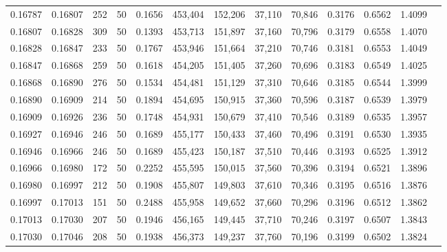 \begin{tabular}{rrrrrrrrrrrrr}
0.16787 & 0.16807 &   252 &  50 &                                     0.1656 & 453,404 & 152,206 &  37,110 &  70,846 & 0.3176 & 0.6562 & 1.4099 \\
0.16807 & 0.16828 &   309 &  50 &                                     0.1393 & 453,713 & 151,897 &  37,160 &  70,796 & 0.3179 & 0.6558 & 1.4070 \\
0.16828 & 0.16847 &   233 &  50 &                                     0.1767 & 453,946 & 151,664 &  37,210 &  70,746 & 0.3181 & 0.6553 & 1.4049 \\
0.16847 & 0.16868 &   259 &  50 &                                     0.1618 & 454,205 & 151,405 &  37,260 &  70,696 & 0.3183 & 0.6549 & 1.4025 \\
0.16868 & 0.16890 &   276 &  50 &                                     0.1534 & 454,481 & 151,129 &  37,310 &  70,646 & 0.3185 & 0.6544 & 1.3999 \\
0.16890 & 0.16909 &   214 &  50 &                                     0.1894 & 454,695 & 150,915 &  37,360 &  70,596 & 0.3187 & 0.6539 & 1.3979 \\
0.16909 & 0.16926 &   236 &  50 &                                     0.1748 & 454,931 & 150,679 &  37,410 &  70,546 & 0.3189 & 0.6535 & 1.3957 \\
0.16927 & 0.16946 &   246 &  50 &                                     0.1689 & 455,177 & 150,433 &  37,460 &  70,496 & 0.3191 & 0.6530 & 1.3935 \\
0.16946 & 0.16966 &   246 &  50 &                                     0.1689 & 455,423 & 150,187 &  37,510 &  70,446 & 0.3193 & 0.6525 & 1.3912 \\
0.16966 & 0.16980 &   172 &  50 &                                     0.2252 & 455,595 & 150,015 &  37,560 &  70,396 & 0.3194 & 0.6521 & 1.3896 \\
0.16980 & 0.16997 &   212 &  50 &                                     0.1908 & 455,807 & 149,803 &  37,610 &  70,346 & 0.3195 & 0.6516 & 1.3876 \\
0.16997 & 0.17013 &   151 &  50 &                                     0.2488 & 455,958 & 149,652 &  37,660 &  70,296 & 0.3196 & 0.6512 & 1.3862 \\
0.17013 & 0.17030 &   207 &  50 &                                     0.1946 & 456,165 & 149,445 &  37,710 &  70,246 & 0.3197 & 0.6507 & 1.3843 \\
0.17030 & 0.17046 &   208 &  50 &                                     0.1938 & 456,373 & 149,237 &  37,760 &  70,196 & 0.3199 & 0.6502 & 1.3824 \\

\end{tabular}

